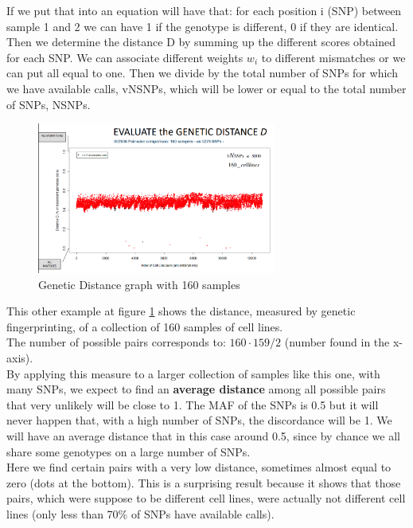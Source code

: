 If we put that into an equation will have that: for each position i (SNP) between sample 1 and 2 we can have 1 if the genotype is different, 0 if they are identical. Then we determine the distance D by summing up the different scores obtained for each SNP. We can associate different weights $w_i$ to different mismatches or we can put all equal to one. Then we divide by the total number of SNPs for which we have available calls, vNSNPs, which will be lower or equal to the total number of SNPs, NSNPs.

\begin{figure}[H]
	\centering
	\includegraphics[width=0.7\textwidth]{loci2.PNG}
	\caption{Genetic Distance graph with 160 samples}
	\label{fig:Distance2}
\end{figure}

This other example at figure \ref{fig:Distance2} shows the distance, measured by genetic fingerprinting, of a collection of 160 samples of cell lines.
\\
The number of possible pairs corresponds to: $160 \cdot 159 / 2$ (number found in the x-axis).
\\
By applying this measure to a larger collection of samples like this one, with many SNPs, we expect to find an \textbf{average distance} among all possible pairs that very unlikely will be close to 1.
The MAF of the SNPs is 0.5 but it will never happen that, with a high number of SNPs, the discordance will be 1. We will have an average distance that in this case around 0.5, since by chance we all share some genotypes on a large number of SNPs.
\\
Here we find certain pairs with a very low distance, sometimes almost equal to zero (dots at the bottom). This is a surprising result because it shows that those pairs, which were suppose to be different cell lines, were actually not different cell lines (only less than 70\% of SNPs have available calls).

